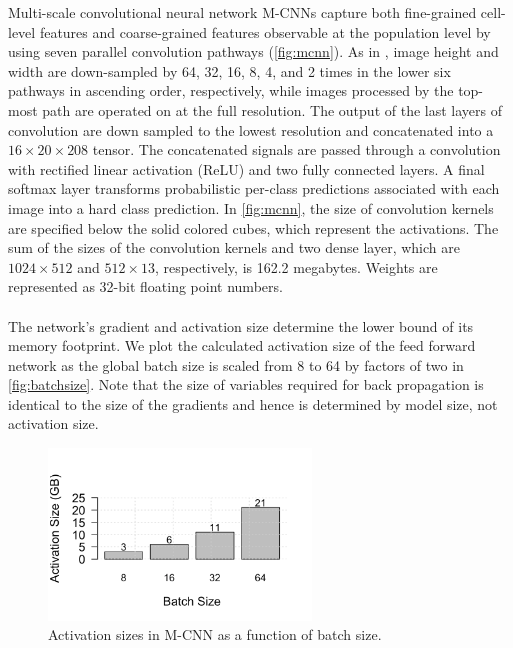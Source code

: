 \begin{section}{Multi-scale convolutional neural network}
	\label{sec:mcnn}
	M-CNNs capture both fine-grained cell-level features and coarse-grained features observable at the population level by using seven parallel convolution pathways (\autoref{fig:mcnn}). As in \cite{Godinez2017}, image height and width are down-sampled by 64, 32, 16, 8, 4, and 2 times in the lower six pathways in ascending order, respectively, while images processed by the top-most path are operated on at the full resolution. The output of the last layers of convolution are down sampled to the lowest resolution and concatenated into a $16 \times 20 \times 208$ tensor. The concatenated signals are passed through a convolution with rectified linear activation (ReLU) and two fully connected layers. A final softmax layer transforms probabilistic per-class predictions associated with each image into a hard class prediction. In \autoref{fig:mcnn}, the size of convolution kernels are specified below the solid colored cubes, which represent the activations. The sum of the sizes of the convolution kernels and two dense layer, which are $1024 \times 512$ and $512 \times 13$, respectively, is 162.2 megabytes. Weights are represented as 32-bit floating point numbers.\\\\
	\noindent The network's gradient and activation size determine the lower bound of its memory footprint. We plot the calculated activation size of the feed forward network as the global batch size is scaled from 8 to 64 by factors of two in \autoref{fig:batchsize}. Note that the size of variables required for back propagation is identical to the size of the gradients and hence is determined by model size, not activation size.

	\begin{figure}[t]
			\centering
			\includegraphics[width=2.75in]{wgrid_figure1b.png}
			\caption{\textsf{Activation sizes in M-CNN as a function of batch size.}}
			\label{fig:batchsize}
	\end{figure}
	
\end{section}
